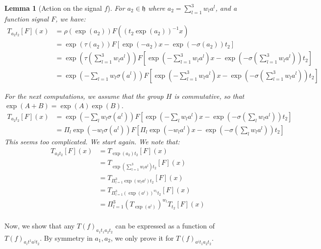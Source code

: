 \documentclass{article}
\newtheorem{lemma}{Lemma}
\begin{document}
\begin{lemma}[Action on the signal $f$]
    For $a_2 \in \mathfrak{h}$ where $a_2 = \sum_{l=1}^3 w_l a^l$, and a function signal $F$, we have:
    \begin{align*}
        T_{a_2t_2}[F](x)
         &= \rho(\exp(a_2))F((t_2\exp(a_2))^{-1}x)\\
         &= \exp(\tau(a_2)) F\left[\exp\left(-a_2\right)x - \exp\left(-\sigma(a_2) \right) t_2\right] \\
         &= \exp\left(\tau\left(\sum_{l=1}^3 w_l a^l\right)\right)
            F\left[
                \exp\left(-\sum_{l=1}^3 w_l a^l\right)x
                - \exp\left(-\sigma(\sum_{l=1}^3 w_l a^l) \right) t_2
            \right] \\
         &= \exp\left( -\sum_{l=1} w_l \sigma(a^l)\right)
                F\left[
                    \exp\left(-\sum_{l=1}^3 w_l a^l\right)x
                    - \exp\left(-\sigma(\sum_{l=1}^3 w_l a^l) \right) t_2
                    \right]
    \end{align*}

For the next computations, we assume that the group $H$ is commutative, so that $\exp(A+B) = \exp(A)\exp(B).$
\begin{align*}
    T_{a_2t_2}[F](x)
    &= \exp\left( -\sum_{l} w_l \sigma(a^l)\right)
            F\left[
                \exp\left(-\sum_{l} w_l a^l\right)x
                - \exp\left(-\sigma(\sum_{l} w_l a^l) \right) t_2
                \right]\\
    &= \Pi_{l}\exp\left( -w_l \sigma(a^l)\right)
            F\left[
                \Pi_{l}\exp\left(-w_l a^l\right)x
                - \exp\left(-\sigma(\sum_{l} w_l a^l) \right) t_2
                \right]
    \end{align*}
This seems too complicated. We start again. We note that:
\begin{align*}
    T_{a_2t_2}[F](x)
     &= T_{\exp(a_2)t_2}[F](x) \\
     &= T_{\exp(\sum_{l=1}^3 w_l a^l)t_2}[F](x) \\
     &= T_{\Pi_{l=1}^3\exp(w_l a^l)t_2}[F](x) \\
     &= T_{\Pi_{l=1}^3\left(\exp(a^l)\right)^{w_l}t_2}[F](x) \\
     &= \Pi_{l=1}^3\left(T_{\exp(a^l)}\right)^{w_l}T_{t_2}[F](x) \\
\end{align*}
\end{lemma}

Now, we show that any $T(f)_{a_1t_1a_2t_2}$ can be expressed as a function of $T(f)_{a_it^1a^jt_2}$. By symmetry in $a_1, a_2$, we only prove it for $T(f)_{a^it_1a_2t_2}$.
\end{document}
